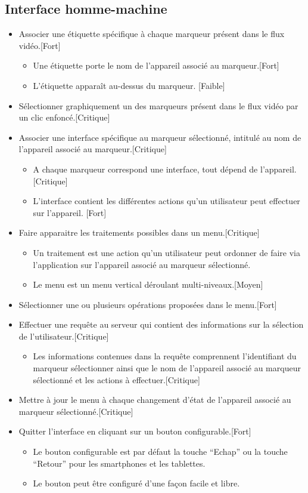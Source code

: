 \documentclass[12pt,a4paper]{article}
\begin{document}
\subsection{Interface homme-machine}
\begin{itemize}
\item Associer une étiquette spécifique à chaque marqueur présent dans le flux vidéo.[Fort]
  \begin{itemize}
  \item Une étiquette porte le nom de l'appareil associé au marqueur.[Fort]
  \item L'étiquette apparaît au-dessus du marqueur. [Faible]
  \end{itemize}
\item Sélectionner graphiquement un des marqueurs présent dans le flux vidéo par un clic enfoncé.[Critique]
\item Associer une interface spécifique au marqueur sélectionné, intitulé au nom de l'appareil associé au marqueur.[Critique]
  \begin{itemize}
  \item A chaque marqueur correspond une interface, tout dépend de l'appareil.[Critique]
  \item L'interface contient les différentes actions qu'un utilisateur peut effectuer sur l'appareil. [Fort]
  \end{itemize}
\item Faire apparaitre les traitements possibles dans un menu.[Critique]
  \begin{itemize}
  \item Un traitement est une action qu'un utilisateur peut ordonner de faire via l'application sur l'appareil associé au marqueur sélectionné.
  \item Le menu est un menu vertical déroulant multi-niveaux.[Moyen]
  \end{itemize}
\item Sélectionner une ou plusieurs opérations proposées dans le menu.[Fort]
\item Effectuer une requête au serveur qui contient des informations sur la sélection de l'utilisateur.[Critique]
  \begin{itemize}
  \item Les informations contenues dans la requête comprennent l'identifiant du marqueur sélectionner ainsi que le nom de l'appareil associé au marqueur sélectionné et les actions à effectuer.[Critique]
  \end{itemize}
\item Mettre à jour le menu à chaque changement d'état de l'appareil associé au marqueur sélectionné.[Critique]
\item Quitter l'interface en cliquant sur un bouton configurable.[Fort]
  \begin{itemize}
  \item Le bouton configurable est par défaut la touche ``Echap'' ou la touche ``Retour'' pour les smartphones et les tablettes.
  \item Le bouton peut être configuré d'une façon facile et libre.
  \end{itemize}
\end{itemize}
\end{document}
